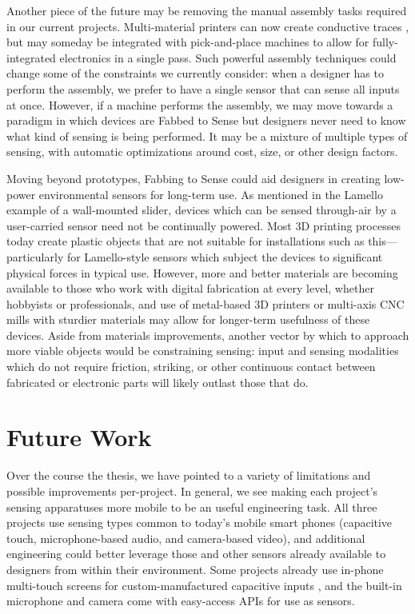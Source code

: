 Another piece of the future may be removing the manual assembly tasks required in our current projects. Multi-material printers can now create conductive traces \cite{voxel8}, but may someday be integrated with pick-and-place machines to allow for fully-integrated electronics in a single pass. Such powerful assembly techniques could change some of the constraints we currently consider: when a designer has to perform the assembly, we prefer to have a single sensor that can sense all inputs at once. However, if a machine performs the assembly, we may move towards a paradigm in which devices are Fabbed to Sense but designers never need to know what kind of sensing is being performed. It may be a mixture of multiple types of sensing, with automatic optimizations around cost, size, or other design factors.

Moving beyond prototypes, Fabbing to Sense could aid designers in creating low-power environmental sensors for long-term use. As mentioned in the Lamello example of a wall-mounted slider, devices which can be sensed through-air by a user-carried sensor need not be continually powered. Most 3D printing processes today create plastic objects that are not suitable for installations such as this---particularly for Lamello-style sensors which subject the devices to significant physical forces in typical use. However, more and better materials are becoming available to those who work with digital fabrication at every level, whether hobbyists or professionals, and use of metal-based 3D printers or multi-axis CNC mills with sturdier materials may allow for longer-term usefulness of these devices. Aside from materials improvements, another vector by which to approach more viable objects would be constraining sensing: input and sensing modalities which do not require friction, striking, or other continuous contact between fabricated or electronic parts will likely outlast those that do.


\section{Future Work}

Over the course the thesis, we have pointed to a variety of limitations and possible improvements per-project. In general, we see making each project's sensing apparatuses more mobile to be an useful engineering task. All three projects use sensing types common to today's mobile smart phones (capacitive touch, microphone-based audio, and camera-based video), and additional engineering could better leverage those and other sensors already available to designers from within their environment. Some projects already use in-phone multi-touch screens for custom-manufactured capacitive inputs \cite{chan-capstones,chang-clipon}, and the built-in microphone and camera come with easy-access APIs for use as sensors.

